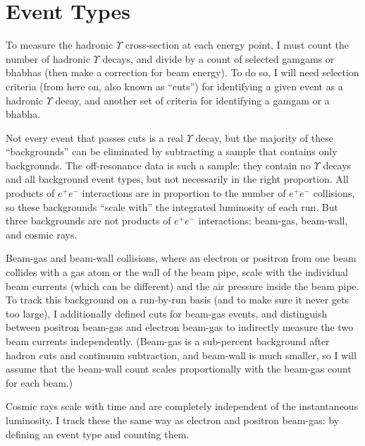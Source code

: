 \section{Event Types}

To measure the hadronic $\Upsilon$ cross-section at each energy point,
I must count the number of hadronic $\Upsilon$ decays, and divide by a
count of selected gamgams or bhabhas (then make a correction for beam
energy).  To do so, I will need selection criteria (from here on, also
known as ``cuts'') for identifying a given event as a hadronic
$\Upsilon$ decay, and another set of criteria for identifying a gamgam
or a bhabha.

Not every event that passes cuts is a real $\Upsilon$ decay, but the
majority of these ``backgrounds'' can be eliminated by subtracting a
sample that contains only backgrounds.  The off-resonance data is such
a sample: they contain no $\Upsilon$ decays and all background event
types, but not necessarily in the right proportion.  All products of
$e^+e^-$ interactions are in proportion to the number of $e^+e^-$
collisions, so these backgrounds ``scale with'' the integrated
luminosity of each run.  But three backgrounds are not products of
$e^+e^-$ interactions: beam-gas, beam-wall, and cosmic rays.

Beam-gas and beam-wall collisions, where an electron or positron from
one beam collides with a gas atom or the wall of the beam pipe, scale
with the individual beam currents (which can be different) and the air
pressure inside the beam pipe.  To track this background on a
run-by-run basis (and to make sure it never gets too large), I
additionally defined cuts for beam-gas events, and distinguish between
positron beam-gas and electron beam-gas to indirectly measure the two
beam currents independently.  (Beam-gas is a sub-percent background
after hadron cuts and continuum subtraction, and beam-wall is much
smaller, so I will assume that the beam-wall count scales
proportionally with the beam-gas count for each beam.)

Cosmic rays scale with time and are completely independent of the
instantaneous luminosity.  I track these the same way as electron and
positron beam-gas: by defining an event type and counting them.

